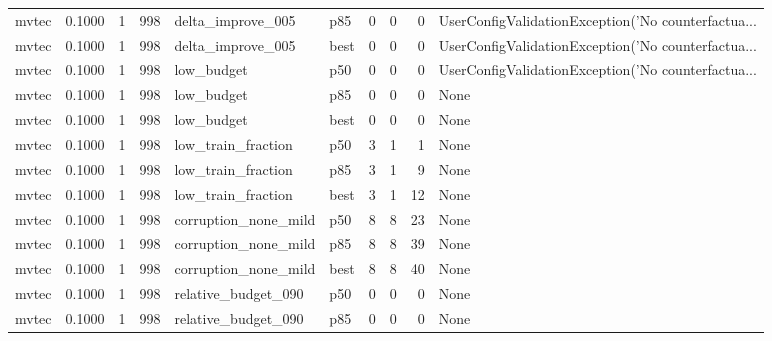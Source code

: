 \begin{tabular}{lrrrllrrrl}
   mvtec &    0.1000 &    1 &    998 &    delta\_improve\_005 &    p85 &               0 &          0 &       0 & UserConfigValidationException('No counterfactua... \\
   mvtec &    0.1000 &    1 &    998 &    delta\_improve\_005 &   best &               0 &          0 &       0 & UserConfigValidationException('No counterfactua... \\
   mvtec &    0.1000 &    1 &    998 &           low\_budget &    p50 &               0 &          0 &       0 & UserConfigValidationException('No counterfactua... \\
   mvtec &    0.1000 &    1 &    998 &           low\_budget &    p85 &               0 &          0 &       0 &                                               None \\
   mvtec &    0.1000 &    1 &    998 &           low\_budget &   best &               0 &          0 &       0 &                                               None \\
   mvtec &    0.1000 &    1 &    998 &   low\_train\_fraction &    p50 &               3 &          1 &       1 &                                               None \\
   mvtec &    0.1000 &    1 &    998 &   low\_train\_fraction &    p85 &               3 &          1 &       9 &                                               None \\
   mvtec &    0.1000 &    1 &    998 &   low\_train\_fraction &   best &               3 &          1 &      12 &                                               None \\
   mvtec &    0.1000 &    1 &    998 & corruption\_none\_mild &    p50 &               8 &          8 &      23 &                                               None \\
   mvtec &    0.1000 &    1 &    998 & corruption\_none\_mild &    p85 &               8 &          8 &      39 &                                               None \\
   mvtec &    0.1000 &    1 &    998 & corruption\_none\_mild &   best &               8 &          8 &      40 &                                               None \\
   mvtec &    0.1000 &    1 &    998 &  relative\_budget\_090 &    p50 &               0 &          0 &       0 &                                               None \\
   mvtec &    0.1000 &    1 &    998 &  relative\_budget\_090 &    p85 &               0 &          0 &       0 &                                               None \\

\end{tabular}
